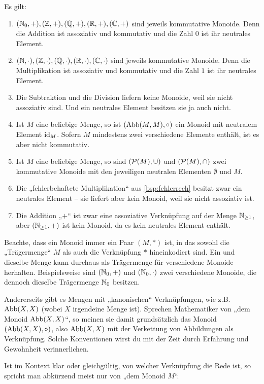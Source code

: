 \begin{bsp} Es gilt:
    \begin{enumerate}
        \item $(\mathbb N_0,+),(\mathbb Z,+),(\mathbb Q,+),(\mathbb R,+),(\mathbb C,+)$ sind jeweils kommutative Monoide. Denn die Addition ist assoziativ und kommutativ und die Zahl $0$ ist ihr neutrales Element.
        \item $(\mathbb N,\cdot),(\mathbb Z,\cdot),(\mathbb Q,\cdot),(\mathbb R,\cdot),(\mathbb C,\cdot)$ sind jeweils kommutative Monoide. Denn die Multiplikation ist assoziativ und kommutativ und die Zahl $1$ ist ihr neutrales Element.
        \item Die Subtraktion und die Division liefern keine Monoide, weil sie nicht assoziativ sind. Und ein neutrales Element besitzen sie ja auch nicht.
        \item Ist $M$ eine beliebige Menge, so ist $(\operatorname{Abb}(M,M),\circ)$ ein Monoid mit neutralem Element $\mathrm{id}_M$. Sofern $M$ mindestens zwei verschiedene Elemente enthält, ist es aber nicht kommutativ.
        \item Ist $M$ eine beliebige Menge, so sind $(\mathcal P(M),\cup)$ und $(\mathcal P(M),\cap)$ zwei kommutative Monoide mit den jeweiligen neutralen Elementen $\emptyset$ und $M$.
        \item Die „fehlerbehaftete Multiplikation“ aus \cref{bsp:fehlerrech} besitzt zwar ein neutrales Element -- sie liefert aber kein Monoid, weil sie nicht assoziativ ist.
        \item Die Addition „$+$“ ist zwar eine assoziative Verknüpfung auf der Menge $\mathbb N_{\ge 1}$, aber $(\mathbb N_{\ge 1},+)$ ist kein Monoid, da es kein neutrales Element enthält.
    \end{enumerate}
\end{bsp}


\begin{bem}[Trägermenge]
    Beachte, dass ein Monoid immer ein Paar $(M,*)$ ist, in das sowohl die „Trägermenge“ $M$ als auch die Verknüpfung $*$ hineinkodiert sind. Ein und dieselbe Menge kann durchaus als Trägermenge für verschiedene Monoide herhalten. Beispielsweise sind $(\mathbb N_0,+)$ und $(\mathbb N_0,\cdot)$ zwei verschiedene Monoide, die dennoch dieselbe Trägermenge $\mathbb N_0$ besitzen.
    
    Andererseits gibt es Mengen mit „kanonischen“ Verknüpfungen, wie z.B. $\operatorname{Abb}(X,X)$ (wobei $X$ irgendeine Menge ist). Sprechen Mathematiker von „dem Monoid $\operatorname{Abb}(X,X)$“, so meinen sie damit grundsätzlich das Monoid $(\operatorname{Abb}(X,X),\circ)$, also $\operatorname{Abb}(X,X)$ mit der Verkettung von Abbildungen als Verknüpfung. Solche Konventionen wirst du mit der Zeit durch Erfahrung und Gewohnheit verinnerlichen.
    
    Ist im Kontext klar oder gleichgültig, von welcher Verknüpfung die Rede ist, so spricht man abkürzend meist nur von „dem Monoid $M$“.
\end{bem}


